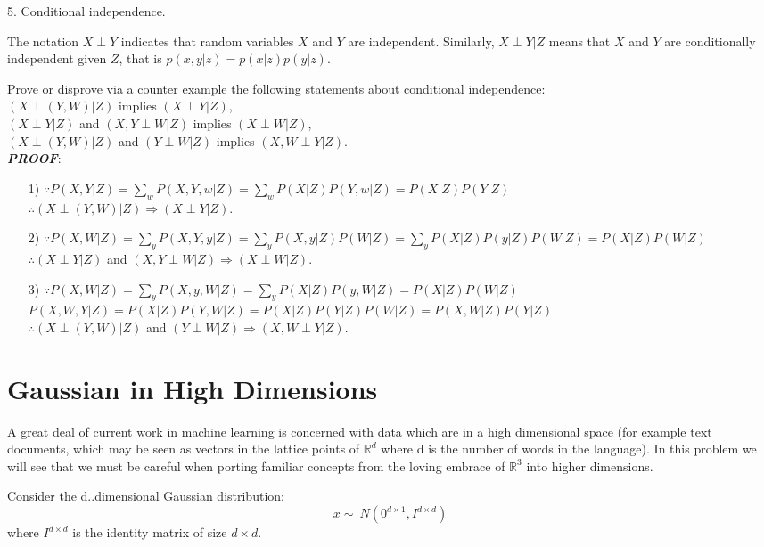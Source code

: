 \documentclass{article}
\theoremstyle{definition}
\theoremstyle{definition}
\theoremstyle{remark}
\begin{document}
5. Conditional independence.

The notation $X\perp Y$ indicates that random variables $X$ and $Y$ are independent. Similarly, $X\perp Y|Z$ means that $X$ and $Y$ are conditionally independent given $Z$,
that is $p(x,y|z)=p(x|z)p(y|z)$.

Prove or disprove via a counter example the following statements about conditional independence:\\
$(X\perp (Y,W)|Z)$ implies $(X\perp Y|Z)$,\\
$(X\perp Y|Z)$ and $(X,Y\perp W|Z)$ implies $(X\perp W|Z)$,\\
$(X\perp (Y,W)|Z)$ and $(Y\perp W|Z)$ implies $(X,W\perp Y|Z)$.\\
\emph{\textbf{PROOF}}:
\begin{enumerate}
\item[1)] $\because P(X,Y|Z)=\sum_{w}P(X, Y, w|Z)=\sum_{w}P(X|Z)P(Y,w|Z)=P(X|Z)P(Y|Z)$\\
    $\therefore(X\perp (Y,W)|Z) \Rightarrow (X\perp Y|Z)$.
\item[2)] $\because P(X,W|Z)=\sum_{y}P(X, Y, y|Z)=\sum_{y}P(X,y|Z)P(W|Z)=\sum_{y}P(X|Z)P(y|Z)P(W|Z)=P(X|Z)P(W|Z)$\\
    $\therefore(X\perp Y|Z)$ and $(X,Y\perp W|Z) \Rightarrow (X\perp W|Z)$.
\item[3)] $\because P(X,W|Z)=\sum_{y}P(X,y,W|Z)=\sum_{y}P(X|Z)P(y,W|Z)=P(X|Z)P(W|Z)$\\
    $P(X,W,Y|Z)=P(X|Z)P(Y,W|Z)=P(X|Z)P(Y|Z)P(W|Z)=P(X,W|Z)P(Y|Z)$\\
    $\therefore(X\perp (Y,W)|Z)$ and $(Y\perp W|Z) \Rightarrow (X,W\perp Y|Z)$.
\end{enumerate}

\section*{Gaussian in High Dimensions}

A great deal of current work in machine learning is concerned with data which are in a high dimensional
space (for example text documents, which may be seen as vectors in the lattice points of $\mathbb{R}^d$
where d is the number of words in the language). In this problem we will see that we must be careful when porting familiar
concepts from the loving embrace of $\mathbb{R}^3$ into higher dimensions.

Consider the d..dimensional Gaussian distribution:
\[
x\sim ~N(0^{d\times 1}, I^{d\times d})
\]
where $I^{d\times d}$ is the identity matrix of size $d\times d$.
\end{document}
